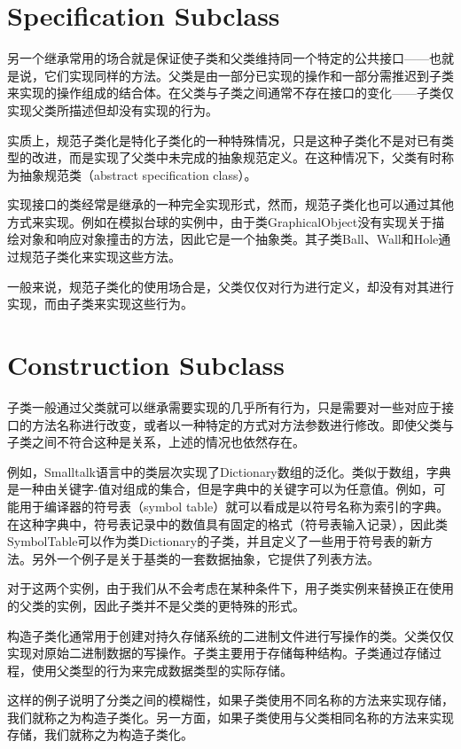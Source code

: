 \section{Specification Subclass}

另一个继承常用的场合就是保证使子类和父类维持同一个特定的公共接口——也就是说，它们实现同样的方法。父类是由一部分已实现的操作和一部分需推迟到子类来实现的操作组成的结合体。在父类与子类之间通常不存在接口的变化——子类仅实现父类所描述但却没有实现的行为。

实质上，规范子类化是特化子类化的一种特殊情况，只是这种子类化不是对已有类型的改进，而是实现了父类中未完成的抽象规范定义。在这种情况下，父类有时称为抽象规范类（abstract specification class）。

实现接口的类经常是继承的一种完全实现形式，然而，规范子类化也可以通过其他方式来实现。例如在模拟台球的实例中，由于类GraphicalObject没有实现关于描绘对象和响应对象撞击的方法，因此它是一个抽象类。其子类Ball、Wall和Hole通过规范子类化来实现这些方法。

一般来说，规范子类化的使用场合是，父类仅仅对行为进行定义，却没有对其进行实现，而由子类来实现这些行为。

\section{Construction Subclass}

子类一般通过父类就可以继承需要实现的几乎所有行为，只是需要对一些对应于接口的方法名称进行改变，或者以一种特定的方式对方法参数进行修改。即使父类与子类之间不符合这种是关系，上述的情况也依然存在。

例如，Smalltalk语言中的类层次实现了Dictionary数组的泛化。类似于数组，字典是一种由关键字-值对组成的集合，但是字典中的关键字可以为任意值。例如，可能用于编译器的符号表（symbol table）就可以看成是以符号名称为索引的字典。在这种字典中，符号表记录中的数值具有固定的格式（符号表输入记录），因此类SymbolTable可以作为类Dictionary的子类，并且定义了一些用于符号表的新方法。另外一个例子是关于基类的一套数据抽象，它提供了列表方法。

对于这两个实例，由于我们从不会考虑在某种条件下，用子类实例来替换正在使用的父类的实例，因此子类并不是父类的更特殊的形式。

构造子类化通常用于创建对持久存储系统的二进制文件进行写操作的类。父类仅仅实现对原始二进制数据的写操作。子类主要用于存储每种结构。子类通过存储过程，使用父类型的行为来完成数据类型的实际存储。

这样的例子说明了分类之间的模糊性，如果子类使用不同名称的方法来实现存储，我们就称之为构造子类化。另一方面，如果子类使用与父类相同名称的方法来实现存储，我们就称之为构造子类化。

